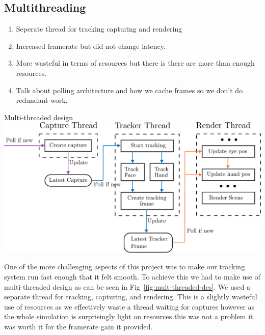 
\subsection{Multithreading}

\begin{enumerate}[itemsep=-0.25em]
	\item Seperate thread for tracking capturing and rendering
	\item Increased framerate but did not change latency.
	\item More wasteful in terms of resources but there is there are more than enough resources.
	\item Talk about polling architecture and how we cache frames so we don't do redundant work.
\end{enumerate}

\begin{figureBox}[label={fig:mult-threaded-des}, width=0.8\linewidth]{Multi-threaded design}
    \includegraphics[width = 0.8\linewidth]{./implementation/figures/multi-thread-design.pdf}
\end{figureBox}

One of the more challenging aspects of this project was to make our tracking system run fast enough that it felt smooth. To achieve this we had to make use of multi-threaded design as can be seen in Fig~\ref{fig:mult-threaded-des}. We used a separate thread for tracking, capturing, and rendering. This is a slightly wasteful use of resources as we effectively waste a thread waiting for captures however as the whole simulation is surprisingly light on resources this was not a problem it was worth it for the framerate gain it provided. \\

